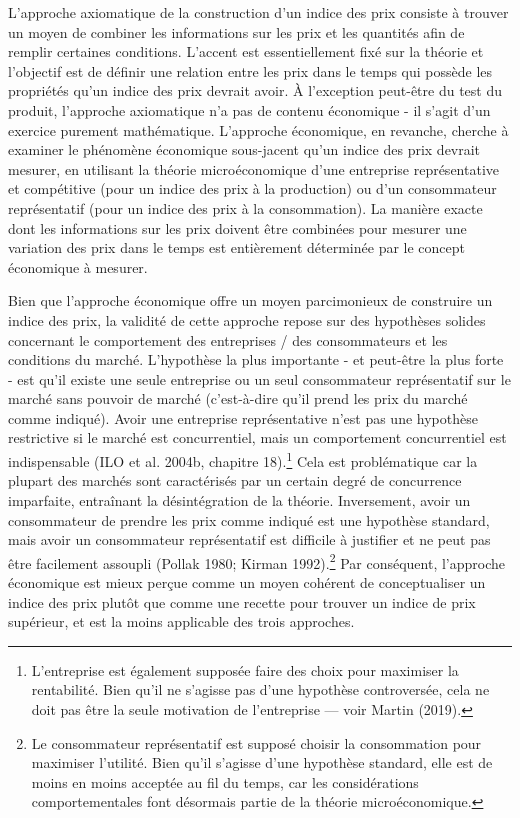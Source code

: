 \documentclass[]{article}
\begin{document}
L'approche axiomatique de la construction d'un indice des prix consiste à trouver un moyen de combiner les informations sur les prix et les quantités afin de remplir certaines conditions. L'accent est essentiellement fixé sur la théorie et l'objectif est de définir une relation entre les prix dans le temps qui possède les propriétés qu'un indice des prix devrait avoir. À l'exception peut-être du test du produit, l'approche axiomatique n'a pas de contenu économique - il s'agit d'un exercice purement mathématique. L'approche économique, en revanche, cherche à examiner le phénomène économique sous-jacent qu'un indice des prix devrait mesurer, en utilisant la théorie microéconomique d'une entreprise représentative et compétitive (pour un indice des prix à la production) ou d'un consommateur représentatif (pour un indice des prix à la consommation). La manière exacte dont les informations sur les prix doivent être combinées pour mesurer une variation des prix dans le temps est entièrement déterminée par le concept économique à mesurer.

Bien que l'approche économique offre un moyen parcimonieux de construire un indice des prix, la validité de cette approche repose sur des hypothèses solides concernant le comportement des entreprises / des consommateurs et les conditions du marché. L'hypothèse la plus importante - et peut-être la plus forte - est qu'il existe une seule entreprise ou un seul consommateur représentatif sur le marché sans pouvoir de marché (c'est-à-dire qu'il prend les prix du marché comme indiqué). Avoir une entreprise représentative n'est pas une hypothèse restrictive si le marché est concurrentiel, mais un comportement concurrentiel est indispensable (ILO et al. 2004b, chapitre 18).\footnote{L'entreprise est également supposée faire des choix pour maximiser la rentabilité. Bien qu'il ne s'agisse pas d'une hypothèse controversée, cela ne doit pas être la seule motivation de l'entreprise --- voir Martin (2019).} Cela est problématique car la plupart des marchés sont caractérisés par un certain degré de concurrence imparfaite, entraînant la désintégration de la théorie. Inversement, avoir un consommateur de prendre les prix comme indiqué est une hypothèse standard, mais avoir un consommateur représentatif est difficile à justifier et ne peut pas être facilement assoupli (Pollak 1980; Kirman 1992).\footnote{Le consommateur représentatif est supposé choisir la consommation pour maximiser l'utilité. Bien qu'il s'agisse d'une hypothèse standard, elle est de moins en moins acceptée au fil du temps, car les considérations comportementales font désormais partie de la théorie microéconomique.} Par conséquent, l'approche économique est mieux perçue comme un moyen cohérent de conceptualiser un indice des prix plutôt que comme une recette pour trouver un indice de prix supérieur, et est la moins applicable des trois approches.
\end{document}

